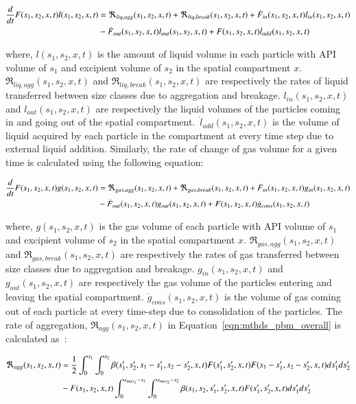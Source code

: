 \documentclass[preprint,11pt,authoryear]{elsarticle}
\begin{document}
\begin{align}
\frac{d}{dt}F(s_1,s_2,x,t)l(s_1,s_2,x,t)&= 
\Re_{liq,agg}(s_1,s_2,x,t)+\Re_{liq,break}(s_1,s_2,x,t)+\dot{F}_{in}(s_1,s_2,x,t)l_{in}(s_1,s_2,x,t)\notag\\
&-\dot{F}_{out}(s_1,s_2,x,t)l_{out}(s_1,s_2,x,t)+F(s_1,s_2,x,t)\dot{l}_{add}(s_1,s_2,x,t)
\label{eqn:mthds_pbm_rate} 
\end{align}

where, $l(s_1,s_2,x,t)$ is the amount of liquid volume in each particle with API volume of $s_1$ and 
excipient volume of $s_2$ in the spatial compartment $x$. $\Re_{liq,agg}(s_1,s_2,x,t)$ and 
$\Re_{liq,break}(s_1,s_2,x,t)$ are respectively the rates of liquid transferred between size classes due to 
aggregation and breakage. $l_{in}(s_1,s_2,x,t)$ and $l_{out}(s_1,s_2,x,t)$ are respectively the liquid 
volumes of the particles coming in and going out of the spatial compartment.~$\dot{l}_{add}(s_1,s_2,x,t)$ is 
the volume of liquid acquired by each particle in the compartment at every time step due to external 
liquid addition.
Similarly, the rate of change of gas volume for a given time is calculated using the following equation: 

\begin{align}
\frac{d}{dt}F(s_1,s_2,x,t)g(s_1,s_2,x,t)&= 
\Re_{gas,agg}(s_1,s_2,x,t)+\Re_{gas,break}(s_1,s_2,x,t)+\dot{F}_{in}(s_1,s_2,x,t)g_{in}(s_1,s_2,x,t)\notag\\
&-\dot{F}_{out}(s_1,s_2,x,t)g_{out}(s_1,s_2,x,t)+F(s_1,s_2,x,t)\dot{g}_{cons}(s_1,s_2,x,t)
\label{eqn:mthds_pbm_gas_agg} 
\end{align}

where, $g(s_1,s_2,x,t)$ is the gas volume of each particle with API volume of $s_1$ and excipient 
volume of $s_2$ in the spatial compartment $x$. $\Re_{gas,agg}(s_1,s_2,x,t)$ and 
$\Re_{gas,break}(s_1,s_2,x,t)$ are respectively the rates of gas transferred between size classes due to 
aggregation and breakage. $g_{in}(s_1,s_2,x,t)$ and $g_{out}(s_1,s_2,x,t)$ are respectively the gas 
volume of the particles entering and leaving the spatial compartment. $\dot{g}_{cons}(s_1,s_2,x,t)$ is the 
volume of gas coming out of each particle at every time-step due to consolidation of the particles. 
The rate of aggregation, $\Re_{agg}(s_1,s_2,x,t)$ in Equation~\ref{eqn:mthds_pbm_overall} is 
calculated as~\citep{Chaturbedi2017}:

\begin{align}
\Re_{agg}(s_1,s_2,x,t)&= \frac{1}{2}\int _0^{s_1} \int_0^{s_2} 
\beta(s_1',s_2',s_1-s_1',s_2-s_2',x,t)F(s_1',s_2',x,t)F(s_1-s_1',s_2-s_2',x,t)ds_1'ds_2'\notag\\ 
&- F(s_1,s_2,x,t)\int _0^{s_{max_1}-s_1} \int_0^{s_{max_2}-s_2} 
\beta(s_1,s_2,s_1',s_2',x,t)F(s_1',s_2',x,t)ds_1'ds_2'
\end{align}
\end{document}
